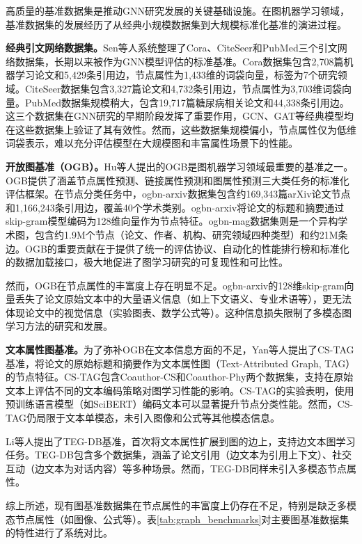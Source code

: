 高质量的基准数据集是推动GNN研究发展的关键基础设施。在图机器学习领域，基准数据集的发展经历了从经典小规模数据集到大规模标准化基准的演进过程。

\textbf{经典引文网络数据集。}Sen等人\cite{sen2008collective}系统整理了Cora、CiteSeer和PubMed三个引文网络数据集，长期以来被作为GNN模型评估的标准基准。Cora数据集包含2,708篇机器学习论文和5,429条引用边，节点属性为1,433维的词袋向量，标签为7个研究领域。CiteSeer数据集包含3,327篇论文和4,732条引用边，节点属性为3,703维词袋向量。PubMed数据集规模稍大，包含19,717篇糖尿病相关论文和44,338条引用边。这三个数据集在GNN研究的早期阶段发挥了重要作用，GCN\cite{kipf2017gcn}、GAT\cite{velickovic2018gat}等经典模型均在这些数据集上验证了其有效性。然而，这些数据集规模偏小，节点属性仅为低维词袋表示，难以充分评估模型在大规模图和丰富属性场景下的性能。

\textbf{开放图基准（OGB）。}Hu等人\cite{hu2020ogb}提出的OGB是图机器学习领域最重要的基准之一。OGB提供了涵盖节点属性预测、链接属性预测和图属性预测三大类任务的标准化评估框架。在节点分类任务中，ogbn-arxiv数据集包含约169,343篇arXiv论文节点和1,166,243条引用边，覆盖40个学术类别。ogbn-arxiv将论文的标题和摘要通过skip-gram模型编码为128维向量作为节点特征。ogbn-mag数据集则是一个异构学术图，包含约1.9M个节点（论文、作者、机构、研究领域四种类型）和约21M条边。OGB的重要贡献在于提供了统一的评估协议、自动化的性能排行榜和标准化的数据加载接口，极大地促进了图学习研究的可复现性和可比性。

然而，OGB在节点属性的丰富度上存在明显不足。ogbn-arxiv的128维skip-gram向量丢失了论文原始文本中的大量语义信息（如上下文语义、专业术语等），更无法体现论文中的视觉信息（实验图表、数学公式等）。这种信息损失限制了多模态图学习方法的研究和发展。

\textbf{文本属性图基准。}为了弥补OGB在文本信息方面的不足，Yan等人\cite{yan2023cstag}提出了CS-TAG基准，将论文的原始标题和摘要作为文本属性图（Text-Attributed Graph, TAG）的节点特征。CS-TAG包含Coauthor-CS和Coauthor-Phy两个数据集，支持在原始文本上评估不同的文本编码策略对图学习性能的影响。CS-TAG的实验表明，使用预训练语言模型（如SciBERT\cite{beltagy2019scibert}）编码文本可以显著提升节点分类性能。然而，CS-TAG仍局限于文本单模态，未引入图像和公式等其他模态信息。

Li等人\cite{li2024tegdb}提出了TEG-DB基准，首次将文本属性扩展到图的边上，支持边文本图学习任务。TEG-DB包含多个数据集，涵盖了论文引用（边文本为引用上下文）、社交互动（边文本为对话内容）等多种场景。然而，TEG-DB同样未引入多模态节点属性。

综上所述，现有图基准数据集在节点属性的丰富度上仍存在不足，特别是缺乏多模态节点属性（如图像、公式等）。表\ref{tab:graph_benchmarks}对主要图基准数据集的特性进行了系统对比。

